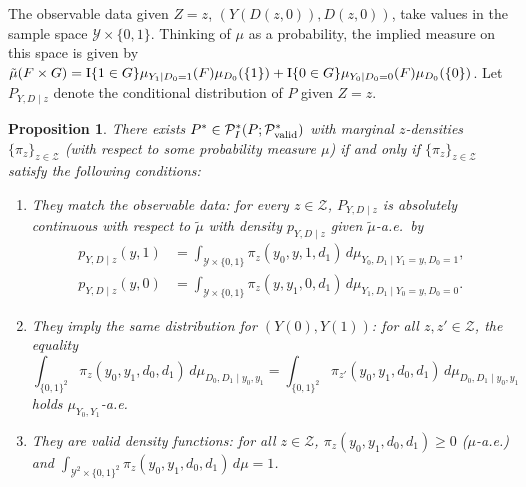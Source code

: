 \documentclass[12pt]{article}%
\newtheorem{prop}{Proposition}
\theoremstyle{definition}
\newcommand\1{\operatorname{I}\indicatorfence}
\begin{document}
\begin{appendices}
The observable data given $Z=z$, $(Y(D(z,0)), D(z,0))$, take values in the sample space
$\mathcal{Y} \times \{0,1\}$. Thinking of $\mu$ as a probability, the implied
measure on this space is given by
$\tilde{\mu}(F\times G)= \1{1\in G}\mu_{Y_{1}\mid D_{0}=1}(F)\mu_{D_{0}}(\{1\})+
\1{0\in G}\mu_{Y_{0}\mid D_{0}=0}(F)\mu_{D_{0}}(\{0\})$. Let $P_{Y, D\mid z}$
denote the conditional distribution of $P$ given $Z=z$.

\begin{prop}\label{theorem:general_statement}
  There exists
  $P^* \in \mathcal{P}^*_{I}(P;\mathcal{P}^{*}_{\textnormal{valid}})$ with
  marginal $z$-densities $\{\pi_{z}\}_{z \in \mathcal{Z}}$ (with respect to some probability measure $\mu$) if and only if
  $\{\pi_{z}\}_{z \in\mathcal{Z}}$ satisfy the following conditions:
  \begin{enumerate}
  \item\label{item:match_data_general} They match the observable data: for every
    $z\in\mathcal{Z}$, $P_{Y, D\mid z}$ is absolutely continuous with respect to
    $\tilde{\mu}$ with density $p_{Y, D\mid z}$ given $\tilde{\mu}$-a.e.\ by
    \begin{align*}
      p_{Y, D\mid z}(y,1) &=\int_{\mathcal{Y} \times \{0,1\}} \pi_{z} (y_0, y,
      1, d_1)\, d\mu_{Y_{0}, D_{1}\mid Y_{1}=y, D_{0}=1}, \\
      p_{Y, D\mid z}(y,0) &=\int_{\mathcal{Y} \times \{0,1\}} \pi_{z} (y, y_1, 0, d_1)\,
                 d\mu_{Y_{1}, D_{1}\mid Y_{0}=y, D_{0}=0}.
    \end{align*}
  \item\label{item:same_marginals_general} They imply the same distribution for
    $(Y(0), Y(1))$: for all $z, z' \in \mathcal{Z}$, the equality
      \begin{equation*}
        \int_{\{0,1\}^2} \pi_{z}(y_0, y_1, d_0, d_1)
        \, d\mu_{D_{0}, D_{1}\mid y_{0}, y_{1}}
        =\int_{\{0,1\}^2} \pi_{z'}(y_0, y_1, d_0, d_1)
        \, d\mu_{D_{0}, D_{1}\mid y_{0}, y_{1}}
      \end{equation*}
      holds $\mu_{Y_{0}, Y_{1}}$-a.e.
    \item\label{item:valid_pmf_general} They are valid density functions: for
      all $z \in\mathcal{Z}$, $\pi_{z}(y_0, y_1, d_0, d_1) \geq 0$ ($\mu$-a.e.)
      and
      $\int_{\mathcal{Y}^2 \times \{0,1\}^2} \pi_{z}(y_{0}, y_{1}, d_{0}, d_{1})
      \, d\mu= 1$.
\end{enumerate}
\end{prop}


\end{appendices}
\end{document}
